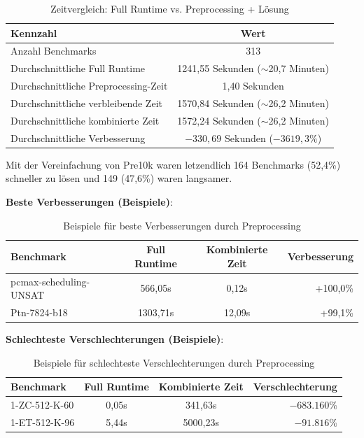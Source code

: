 \begin{table}[H]
    \centering
    \begin{tabular}{lc}
        \textbf{Kennzahl} & \textbf{Wert} \\
        \toprule
        Anzahl Benchmarks & 313 \\
        \midrule
        Durchschnittliche Full Runtime & 1241,55 Sekunden ($\sim$20,7 Minuten) \\
        \midrule
        Durchschnittliche Preprocessing-Zeit & 1,40 Sekunden \\
        \midrule
        Durchschnittliche verbleibende Zeit & 1570,84 Sekunden ($\sim$26,2 Minuten) \\
        \midrule
        Durchschnittliche kombinierte Zeit & 1572,24 Sekunden ($\sim$26,2 Minuten) \\
        \midrule
        Durchschnittliche Verbesserung & $-330,69$ Sekunden ($-3619,3\%$) \\
        \bottomrule
    \end{tabular}
    \caption{Zeitvergleich: Full Runtime vs. Preprocessing + Lösung}\label{tab:time_comparison}
\end{table}

Mit der Vereinfachung von Pre10k waren letzendlich 164 Benchmarks (52,4\%) schneller zu lösen und 
149 (47,6\%) waren langsamer.

\textbf{Beste Verbesserungen (Beispiele)}:
\begin{table}[H]
    \centering
    \begin{tabular}{lccr}
        \toprule
        \textbf{Benchmark} & \textbf{Full Runtime} & \textbf{Kombinierte Zeit} & \textbf{Verbesserung} \\
        \midrule
        pcmax-scheduling-UNSAT & 566,05s & 0,12s & +100,0\% \\
        \midrule
        Ptn-7824-b18 & 1303,71s & 12,09s & +99,1\% \\
        \bottomrule
    \end{tabular}
    \caption{Beispiele für beste Verbesserungen durch Preprocessing}\label{tab:best_improvements}
\end{table}

\textbf{Schlechteste Verschlechterungen (Beispiele)}:
\begin{table}[H]
    \centering
    \begin{tabular}{lccr}
        \toprule
        \textbf{Benchmark} & \textbf{Full Runtime} & \textbf{Kombinierte Zeit} & \textbf{Verschlechterung} \\
        \midrule
        1-ZC-512-K-60 & 0,05s & 341,63s & $-683.160\%$ \\
        \midrule
        1-ET-512-K-96 & 5,44s & 5000,23s & $-91.816\%$ \\
        \bottomrule
    \end{tabular}
    \caption{Beispiele für schlechteste Verschlechterungen durch Preprocessing}\label{tab:worst_degradations}
\end{table}

